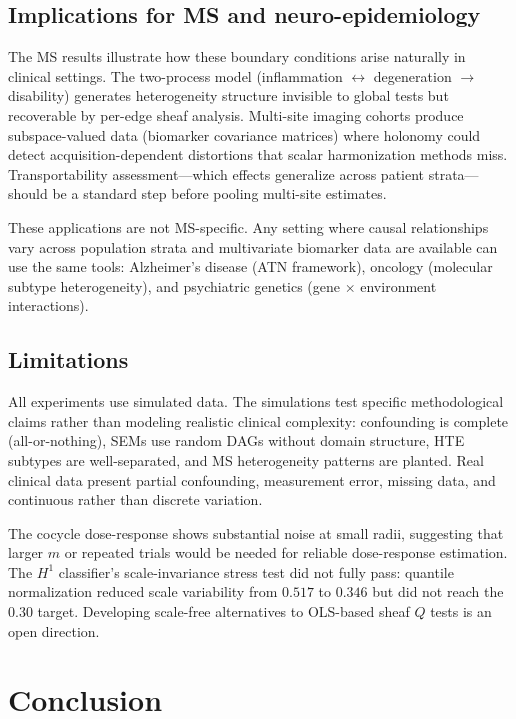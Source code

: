 \documentclass[11pt]{article}
\begin{document}
\subsection{Implications for MS and neuro-epidemiology}

The MS results illustrate how these boundary conditions arise naturally in clinical settings.
The two-process model (inflammation $\leftrightarrow$ degeneration $\to$ disability) generates heterogeneity structure invisible to global tests but recoverable by per-edge sheaf analysis.
Multi-site imaging cohorts produce subspace-valued data (biomarker covariance matrices) where holonomy could detect acquisition-dependent distortions that scalar harmonization methods miss.
Transportability assessment---which effects generalize across patient strata---should be a standard step before pooling multi-site estimates.

These applications are not MS-specific.
Any setting where causal relationships vary across population strata and multivariate biomarker data are available can use the same tools: Alzheimer's disease (ATN framework), oncology (molecular subtype heterogeneity), and psychiatric genetics (gene $\times$ environment interactions).

\subsection{Limitations}

All experiments use simulated data.
The simulations test specific methodological claims rather than modeling realistic clinical complexity: confounding is complete (all-or-nothing), SEMs use random DAGs without domain structure, HTE subtypes are well-separated, and MS heterogeneity patterns are planted.
Real clinical data present partial confounding, measurement error, missing data, and continuous rather than discrete variation.

The cocycle dose-response shows substantial noise at small radii, suggesting that larger $m$ or repeated trials would be needed for reliable dose-response estimation.
The $H^1$ classifier's scale-invariance stress test did not fully pass: quantile normalization reduced scale variability from $0.517$ to $0.346$ but did not reach the $0.30$ target.
Developing scale-free alternatives to OLS-based sheaf $Q$ tests is an open direction.

\section{Conclusion}
\label{sec:conclusion}
\end{document}
